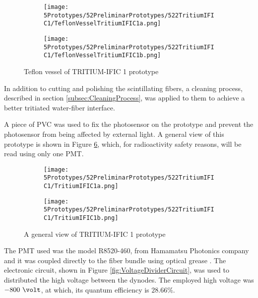 \begin{figure}
\centering
    \begin{subfigure}[b]{0.30\textwidth}
    \centering
    \texttt{[image: 5Prototypes/52PreliminarPrototypes/522TritiumIFIC1/TeflonVesselTritiumIFIC1a.png]}  
    \caption{\label{subfig:TeflonVesselTritumIFIC1a}}
    \end{subfigure}
    \hfill
    \begin{subfigure}[b]{0.45\textwidth}
    \centering
    \texttt{[image: 5Prototypes/52PreliminarPrototypes/522TritiumIFIC1/TeflonVesselTritiumIFIC1b.png]}  
    \caption{\label{subfig:TeflonVesselTritumIFIC1b}}
    \end{subfigure}
 \caption{Teflon vessel of TRITIUM-IFIC 1 prototype}
 \label{fig:TeflonVesselTritumIFIC1}
\end{figure}

In addition to cutting and polishing the scintillating fibers, a cleaning process, described in section \ref{subsec:CleaningProcess}, was applied to them to achieve a better tritiated water-fiber interface.

A piece of PVC was used to fix the photosensor on the prototype and prevent the photosensor from being affected by external light. A general view of this prototype is shown in Figure \ref{fig:TritumIFIC1}, which, for radioactivity safety reasons, will be read using only one PMT.

\begin{figure}
\centering
    \begin{subfigure}[b]{0.40\textwidth}
    \centering
    \texttt{[image: 5Prototypes/52PreliminarPrototypes/522TritiumIFIC1/TritiumIFIC1a.png]}  
    \caption{\label{subfig:TritumIFIC1a}}
    \end{subfigure}
    \hfill
    \begin{subfigure}[b]{0.40\textwidth}
    \centering
    \texttt{[image: 5Prototypes/52PreliminarPrototypes/522TritiumIFIC1/TritiumIFIC1b.png]}  
    \caption{\label{subfig:TritumIFIC1b}}
    \end{subfigure}
 \caption{A general view of TRITIUM-IFIC 1 prototype}
 \label{fig:TritumIFIC1}
\end{figure}

The PMT used was the model R8520-460, from Hamamatsu Photonics company \cite{DataSheetPMTs} and it was coupled directly to the fiber bundle using optical grease \cite{OpticalGrease}. The electronic circuit, shown in Figure \ref{fig:VoltageDividerCircuit}, was used to distributed the high voltage between the dynodes. The employed high voltage was $-800~\volt$, at which, its quantum efficiency is $28.66\%$.


